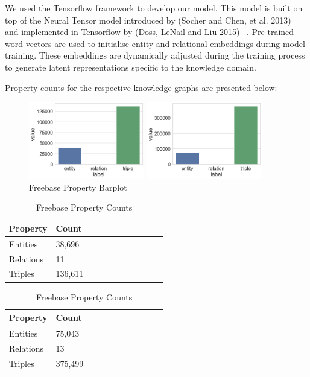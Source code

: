 We used the Tensorflow framework to develop our model.  This model is built on top of the Neural Tensor model introduced by (Socher and Chen, et al. 2013) ~\citep{socher2013reasoning} and implemented in Tensorflow by (Doss, LeNail and Liu 2015)  ~\citep{Doss2015}. Pre-trained word vectors are used to initialise entity and relational embeddings during model training. These embeddings are dynamically adjusted during the training process to generate latent representations specific to the knowledge domain. \bigskip

Property counts for the respective knowledge graphs are presented below:

\begin{figure}[H]
	\parbox{.5\linewidth}{
   		\caption{Wordnet Property Barplot}
   		\centering
    		\includegraphics[width=0.45\textwidth]{Wordnet_Counts}
		}
	\hfill
	\parbox{.5\linewidth}{
		\caption{Freebase Property Barplot}
   		\centering
    		\includegraphics[width=0.45\textwidth]{Freebase_Counts}
		}
\end{figure}


\begin{table}[H]
	\parbox{.5\linewidth}{
		\caption{Wordnet Property Counts}
		\centering
		\begin{tabular}{lllllllllll}
  			\textbf{Property} & \textbf{Count}  \\
  			\hline
  			Entities & 38,696  \\
  			Relations & 11  \\
  			Triples & 136,611  \\
		\end{tabular}
		}
	\hfill
	\parbox{.5\linewidth}{
		\caption{Freebase Property Counts}
		\centering
		\begin{tabular}{lllllllllll}
  			\textbf{Property} & \textbf{Count}  \\
  			\hline
  			Entities & 75,043   \\
  			Relations & 13  \\
  			Triples & 375,499  \\
		\end{tabular}
		}
\end{table}


